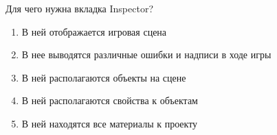 
Для чего нужна вкладка Inspector?

\begin{enumerate}
    \item В ней отображается игровая сцена
    \item В нее выводятся различные ошибки и надписи в ходе игры
    \item В ней располагаются объекты на сцене
    \item В ней располагаются свойства к объектам
    \item В ней находятся все материалы к проекту
\end{enumerate}